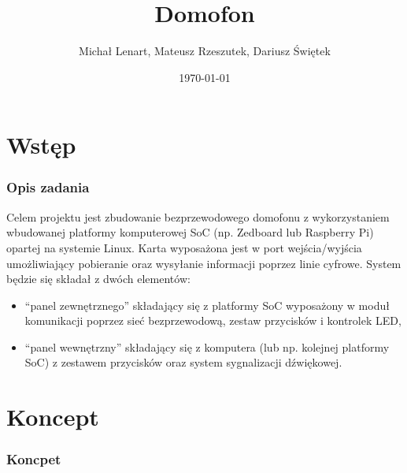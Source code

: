 \documentclass[presentation, 10pt]{beamer}
\institute[IS]{Informatyka Stosowana}
\author[M. Lenart, M. Rzeszutek, D. Świętek]{Michał Lenart, Mateusz Rzeszutek, Dariusz Świętek}
\title{Domofon}
\date{\today}
\begin{document}
\maketitle






\section{Wstęp}
\label{sec-1}
\begin{frame}
\frametitle{Opis zadania}
\label{sec-1-1}

Celem projektu jest zbudowanie bezprzewodowego domofonu z wykorzystaniem wbudowanej
platformy komputerowej SoC (np. Zedboard lub Raspberry Pi) opartej na systemie Linux. Karta
wyposażona jest w port wejścia/wyjścia umożliwiający pobieranie oraz wysyłanie informacji
poprzez linie cyfrowe. System będzie się składał z dwóch elementów:
\begin{itemize}
\item ``panel zewnętrznego'' składający się z platformy SoC wyposażony w moduł komunikacji
  poprzez sieć bezprzewodową, zestaw przycisków i kontrolek LED,
\item ``panel wewnętrzny'' składający się z komputera (lub np. kolejnej platformy SoC) z
  zestawem przycisków oraz system sygnalizacji dźwiękowej.
\end{itemize}
\end{frame}
\section{Koncept}
\label{sec-2}
\begin{frame}
\frametitle{Koncpet}
\label{sec-2-1}

\end{frame}
\end{document}
